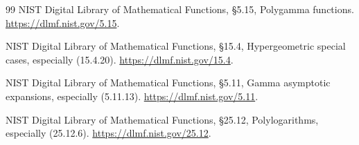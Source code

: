 \begin{thebibliography}{99}
NIST Digital Library of Mathematical Functions,
\S5.15, Polygamma functions.
\url{https://dlmf.nist.gov/5.15}.

NIST Digital Library of Mathematical Functions,
\S15.4, Hypergeometric special cases, especially (15.4.20).
\url{https://dlmf.nist.gov/15.4}.

NIST Digital Library of Mathematical Functions,
\S5.11, Gamma asymptotic expansions, especially (5.11.13).
\url{https://dlmf.nist.gov/5.11}.

NIST Digital Library of Mathematical Functions,
\S25.12, Polylogarithms, especially (25.12.6).
\url{https://dlmf.nist.gov/25.12}.
\end{thebibliography}
